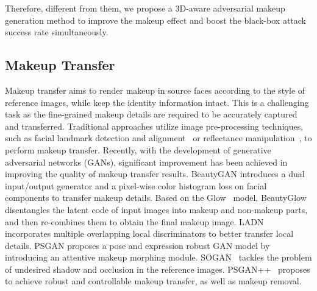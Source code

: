 \documentclass[10pt,journal,compsoc]{IEEEtran}
\begin{document}
Therefore, different from them, we propose a 3D-aware adversarial makeup generation method to improve the makeup effect and boost the black-box attack success rate simultaneously.

\subsection{Makeup Transfer} 
Makeup transfer aims to render makeup in source faces according to the style of reference images, while keep the identity information intact. This is a challenging task as the fine-grained makeup details are required to be accurately captured and transferred. Traditional approaches utilize image pre-processing techniques, such as facial landmark detection and alignment~\cite{xu2013automatic} or reflectance manipulation~\cite{li2015simulating}, to perform makeup transfer. Recently, with the development of generative adversarial networks (GANs), significant improvement has been achieved in improving the quality of makeup transfer results. BeautyGAN \cite{li2018beautygan} introduces a dual input/output generator and a pixel-wise color histogram loss on facial components to transfer makeup details.
Based on the Glow~\cite{kingma2018glow} model, BeautyGlow \cite{chen2019beautyglow} disentangles the latent code of input images into makeup and non-makeup parts, and then re-combines them to obtain the final makeup image. 
LADN~\cite{gu2019ladn} incorporates multiple overlapping local discriminators to better transfer local details. 
PSGAN \cite{jiang2020psgan} proposes a pose and expression robust GAN model by introducing an attentive makeup morphing module.
SOGAN~\cite{lyu2021sogan} tackles the problem of undesired shadow and occlusion in the reference images. 
PSGAN++~\cite{liu2021psgan++} proposes to achieve robust and controllable makeup transfer, as well as makeup removal.
\end{document}
